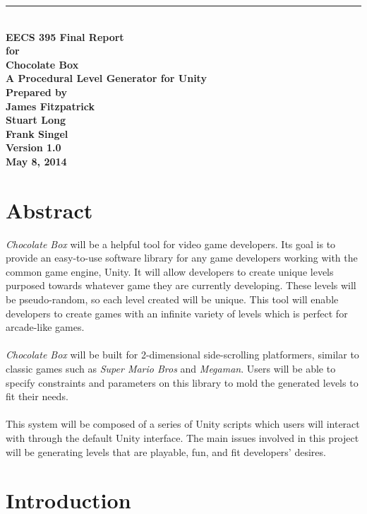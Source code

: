 \documentclass[pdftex,12pt,letter]{article}
\newcommand{\HRule}{\rule{\linewidth}{0.5mm}}
\begin{document}
\begin{titlepage}
\begin{flushright}
\HRule \\[0.4cm]
{ \bfseries
{\huge EECS 395 Final Report\\[1cm]}
{\Large for\\[1cm]}
{\huge Chocolate Box\large\\[.1cm]
A Procedural Level Generator for Unity\\[3cm]}
{\large Prepared by\\[1cm]James Fitzpatrick\\Stuart Long\\Frank Singel\\[2cm]
Version 1.0\\
May 8, 2014\\
}}
\end{flushright}
\end{titlepage}
\FloatBarrier
\newpage
\tableofcontents
\newpage
\section{Abstract}
\textit{Chocolate Box} will be a helpful tool for video game developers. Its goal is to provide an easy-to-use software library for any game developers working with the common game engine, Unity. It will allow developers to create unique levels purposed towards whatever game they are currently developing. These levels will be pseudo-random, so each level created will be unique. This tool will enable developers to create games with an infinite variety of levels which is perfect for arcade-like games. 
\\\\
\textit{Chocolate Box} will be built for 2-dimensional side-scrolling platformers, similar to classic games such as \textit{Super Mario Bros} and \textit{Megaman}. Users will be able to specify constraints and parameters on this library to mold the generated levels to fit their needs. 
\\\\
This system will be composed of a series of Unity scripts which users will interact with through the default Unity interface. The main issues involved in this project will be generating levels that are playable, fun, and fit developers' desires.
\newpage

\section{Introduction}
\end{document}

